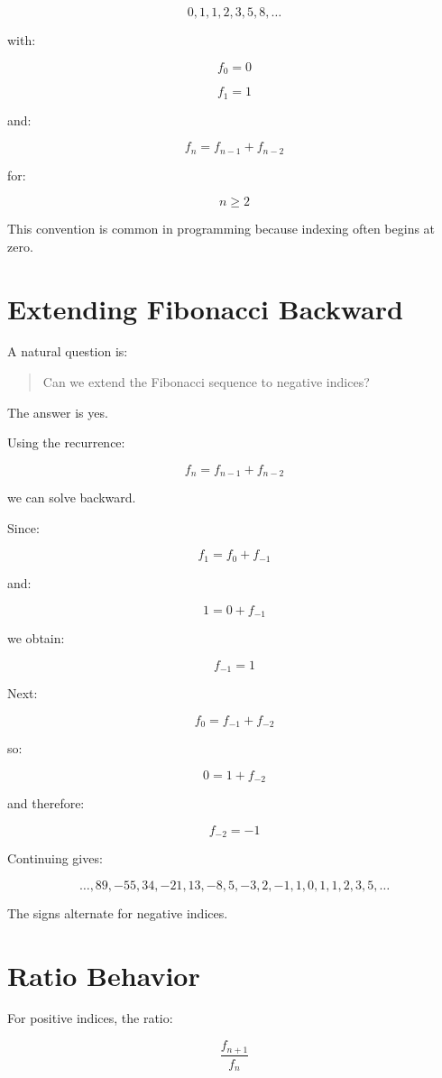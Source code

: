 \documentclass[11pt]{article}
\begin{document}
\[
0, 1, 1, 2, 3, 5, 8, \ldots
\]

with:

\[
f_0 = 0
\]

\[
f_1 = 1
\]

and:

\[
f_n = f_{n-1} + f_{n-2}
\]

for:

\[
n \ge 2
\]

This convention is common in programming because indexing often begins at zero.

\section{Extending Fibonacci Backward}

A natural question is:

\begin{quote}
Can we extend the Fibonacci sequence to negative indices?
\end{quote}

The answer is yes.

Using the recurrence:

\[
f_n = f_{n-1} + f_{n-2}
\]

we can solve backward.

Since:

\[
f_1 = f_0 + f_{-1}
\]

and:

\[
1 = 0 + f_{-1}
\]

we obtain:

\[
f_{-1} = 1
\]

Next:

\[
f_0 = f_{-1} + f_{-2}
\]

so:

\[
0 = 1 + f_{-2}
\]

and therefore:

\[
f_{-2} = -1
\]

Continuing gives:

\[
\ldots, 89, -55, 34, -21, 13, -8, 5, -3, 2, -1, 1, 0, 1, 1, 2, 3, 5, \ldots
\]

The signs alternate for negative indices.

\section{Ratio Behavior}

For positive indices, the ratio:

\[
\frac{f_{n+1}}{f_n}
\]
\end{document}
